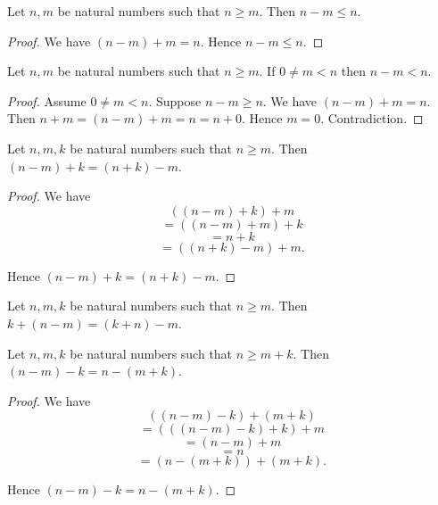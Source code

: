 \documentclass[10pt]{article}
\begin{document}
  \begin{forthel}
    \begin{proposition}[id=ARITHMETIC_05_4222566117933056,printid]
      Let $n, m$ be natural numbers such that $n \geq m$.
      Then $n - m \leq n$.
    \end{proposition}
    \begin{proof}
      We have $(n - m) + m = n$.
      Hence $n - m \leq n$.
    \end{proof}
  \end{forthel}

  \begin{forthel}
    \begin{proposition}[id=ARITHMETIC_05_1269537257291776,printid]
      Let $n, m$ be natural numbers such that $n \geq m$.
      If $0 \neq m < n$ then $n - m < n$.
    \end{proposition}
    \begin{proof}
      Assume $0 \neq m < n$.
      Suppose $n - m \geq n$.
      We have $(n - m) + m = n$.
      Then $n + m
        = (n - m) + m
        = n
        = n + 0$.
      Hence $m = 0$.
      Contradiction.
    \end{proof}
  \end{forthel}

  \begin{forthel}
    \begin{proposition}[id=ARITHMETIC_05_4767595811045376,printid]
      Let $n, m, k$ be natural numbers such that $n \geq m$.
      Then $(n - m) + k = (n + k) - m$.
    \end{proposition}
    \begin{proof}
      We have
      \[  ((n - m) + k) + m       \]
      \[    = ((n - m) + m) + k   \]
      \[    = n + k               \]
      \[    = ((n + k) - m) + m.  \]

      Hence $(n - m) + k = (n + k) - m$.
    \end{proof}
  \end{forthel}

  \begin{forthel}
    \begin{corollary}[id=ARITHMETIC_05_7578468875239424,printid]
      Let $n, m, k$ be natural numbers such that $n \geq m$.
      Then $k + (n - m) = (k + n) - m$.
    \end{corollary}
  \end{forthel}

  \begin{forthel}
    \begin{proposition}[id=ARITHMETIC_05_7595909347016704,printid]
      Let $n, m, k$ be natural numbers such that $n \geq  m + k$.
      Then $(n - m) - k = n - (m + k)$.
    \end{proposition}
    \begin{proof}
      We have
      \[  ((n - m) - k) + (m + k)       \]
      \[    = (((n - m) - k) + k) + m   \]
      \[    = (n - m) + m               \]
      \[    = n                         \]
      \[    = (n - (m + k)) + (m + k).  \]

      Hence $(n - m) - k = n - (m + k)$.
    \end{proof}
  \end{forthel}
\end{document}
